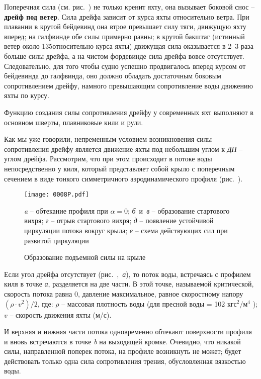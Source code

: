 Поперечная сила  (см. рис.~) не только кренит яхту, она вызывает боковой снос \--- \textbf{дрейф под ветер}. Сила дрейфа зависит от курса яхты относительно ветра. При плавании в крутой бейдевинд она втрое превышает силу тяги, движущую яхту вперед; на галфвинде обе силы примерно равны; в крутой бакштаг (истинный ветер около 135\gr относительно курса яхты) движущая сила оказывается в 2--3 раза больше силы дрейфа, а на чистом фордевинде сила дрейфа вовсе отсутствует. Следовательно, для того чтобы судно успешно продвигалось вперед курсом от бейдевинда до галфвинда, оно должно обладать достаточным боковым сопротивлением дрейфу, намного превышающим сопротивление воды движению яхты по курсу. 

Функцию создания силы сопротивления дрейфу у современных яхт выполняют в основном шверты, плавниковые кили и рули. 

Как мы уже говорили, непременным условием возникновения силы сопротивления дрейфу является движение яхты под небольшим углом к \textit{ДП} \--- углом дрейфа. Рассмотрим, что при этом происходит в потоке воды непосредственно у киля, который представляет собой крыло с поперечным сечением в виде тонкого симметричного аэродинамического профиля (рис.~).

\begin{figure*}[htb]
  \centering
  \texttt{[image: 0008P.pdf]}
  \caption{Образование подъемной силы на крыле}
  \label{fig:8}
  \centering{}\small \textit{a} \--- обтекание профиля при $\alpha = 0$;
                     \textit{б}~и~\textit{в} \--- образование стартового вихря;
                     \textit{г} \--- отрыв стартового вихря;
                     \textit{д} \--- появление устойчивой циркуляции потока вокруг крыла;
                     \textit{е} \--- схема действующих сил при развитой циркуляции
\end{figure*}

Если угол дрейфа отсутствует (рис.~,~\textit{а}), то поток воды, встречаясь с профилем киля в точке \textit{а}, разделяется на две части. В этой точке, называемой критической, скорость потока равна 0, давление максимальное, равное скоростному напору $(\rho \cdot v^2) / 2$, где: $\rho$ \--- массовая плотность воды (для пресной воды = 102 $\text{кгс}^2 / \text{м}^4$ ); $v$ \--- скорость движения яхты (м/с). 

И верхняя и нижняя части потока одновременно обтекают поверхности профиля и вновь встречаются в точке \textit{b} на выходящей кромке. Очевидно, что никакой силы, направленной поперек потока, на профиле возникнуть не может; будет действовать только одна сила сопротивления трения, обусловленная вязкостью воды. 

